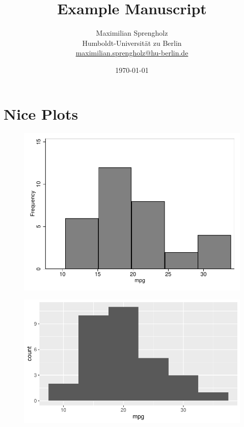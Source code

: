 \documentclass[a4paper,12pt]{scrartcl}
\title{Example Manuscript}
\author{
    Maximilian Sprengholz \\[-15pt]
    {\small Humboldt-Universität zu Berlin}  \\[-15pt]
    {\small \href{mailto:maximilian.sprengholz@hu-berlin.de}{maximilian.sprengholz@hu-berlin.de}}
}
\date{\normalsize \today}
\begin{document}
\maketitle
\thispagestyle{empty}

\newpage

\section{Nice Plots}

\begin{figure}[!ht]
	\begin{center}
        \includegraphics{../../results/figures/stata_hist_mpg.pdf}
	\end{center}
\end{figure}

\begin{figure}[!ht]
	\begin{center}
        \includegraphics{../../results/figures/r_hist_mpg.pdf}
	\end{center}
\end{figure}
\end{document}
